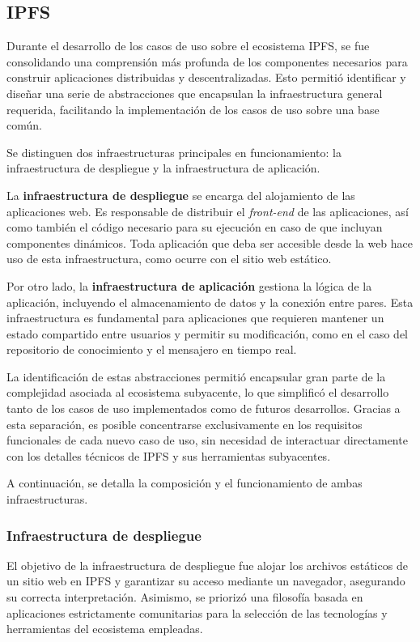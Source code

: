 \subsection{IPFS}

Durante el desarrollo de los casos de uso sobre el ecosistema IPFS, se fue consolidando una comprensión más profunda de los componentes necesarios para construir aplicaciones distribuidas y descentralizadas. Esto permitió identificar y diseñar una serie de abstracciones que encapsulan la infraestructura general requerida, facilitando la implementación de los casos de uso sobre una base común.

Se distinguen dos infraestructuras principales en funcionamiento: la infraestructura de despliegue y la infraestructura de aplicación.

La \textbf{infraestructura de despliegue} se encarga del alojamiento de las aplicaciones web. Es responsable de distribuir el \textit{front-end} de las aplicaciones, así como también el código necesario para su ejecución en caso de que incluyan componentes dinámicos. Toda aplicación que deba ser accesible desde la web hace uso de esta infraestructura, como ocurre con el sitio web estático.

Por otro lado, la \textbf{infraestructura de aplicación} gestiona la lógica de la aplicación, incluyendo el almacenamiento de datos y la conexión entre pares. Esta infraestructura es fundamental para aplicaciones que requieren mantener un estado compartido entre usuarios y permitir su modificación, como en el caso del repositorio de conocimiento y el mensajero en tiempo real.

La identificación de estas abstracciones permitió encapsular gran parte de la complejidad asociada al ecosistema subyacente, lo que simplificó el desarrollo tanto de los casos de uso implementados como de futuros desarrollos. Gracias a esta separación, es posible concentrarse exclusivamente en los requisitos funcionales de cada nuevo caso de uso, sin necesidad de interactuar directamente con los detalles técnicos de IPFS y sus herramientas subyacentes.

A continuación, se detalla la composición y el funcionamiento de ambas infraestructuras.

\subsubsection{Infraestructura de despliegue}

El objetivo de la infraestructura de despliegue fue alojar los archivos estáticos de un sitio web en IPFS y garantizar su acceso mediante un navegador, asegurando su correcta interpretación. Asimismo, se priorizó una filosofía basada en aplicaciones estrictamente comunitarias para la selección de las tecnologías y herramientas del ecosistema empleadas.

